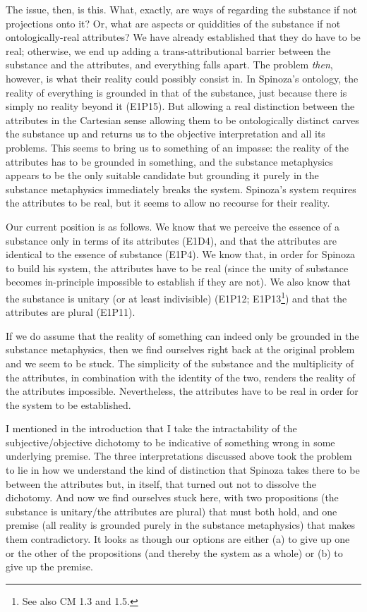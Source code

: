 \documentclass[11pt]{article}
\newcommand{\dash}{\unskip{---}}
\begin{document}
	The issue, then, is this. What, exactly, are ways of regarding the substance if not projections onto it? Or, what are aspects or quiddities of the substance if not ontologically-real attributes? We have already established that they do have to be real; otherwise, we end up adding a trans-attributional barrier between the substance and the attributes, and everything falls apart. The problem \emph{then}, however, is what their reality could possibly consist in. In Spinoza’s ontology, the reality of everything is grounded in that of the substance, just because there is simply no reality beyond it (E1P15). But allowing a real distinction between the attributes in the Cartesian sense \dash allowing them to be ontologically distinct \dash carves the substance up and returns us to the objective interpretation and all its problems. This seems to bring us to something of an impasse: the reality of the attributes has to be grounded in something, and the substance metaphysics appears to be the only suitable candidate \dash but grounding it purely in the substance metaphysics immediately breaks the system. Spinoza’s system requires the attributes to be real, but it seems to allow no recourse for their reality.
	
	Our current position is as follows. We know that we perceive the essence of a substance only in terms of its attributes (E1D4), and that the attributes are identical to the essence of substance (E1P4). We know that, in order for Spinoza to build his system, the attributes have to be real (since the unity of substance becomes in-principle impossible to establish if they are not). We also know that the substance is unitary (or at least indivisible) (E1P12; E1P13\footnote{See also CM 1.3 and 1.5.}) and that the attributes are plural (E1P11).
	
	If we do assume that the reality of something can indeed only be grounded in the substance metaphysics, then we find ourselves right back at the original problem \dash and we seem to be stuck. The simplicity of the substance and the multiplicity of the attributes, in combination with the identity of the two, renders the reality of the attributes impossible. Nevertheless, the attributes have to be real in order for the system to be established.
	
	I mentioned in the introduction that I take the intractability of the subjective/objective dichotomy to be indicative of something wrong in some underlying premise. The three interpretations discussed above took the problem to lie in how we understand the kind of distinction that Spinoza takes there to be between the attributes \dash but, in itself, that turned out not to dissolve the dichotomy. And now we find ourselves stuck here, with two propositions (the substance is unitary/the attributes are plural) that must both hold, and one premise (all reality is grounded purely in the substance metaphysics) that makes them contradictory. It looks as though our options are either (a) to give up one or the other of the propositions (and thereby the system as a whole) or (b) to give up the premise.
	
\end{document}

